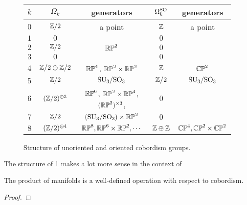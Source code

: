 \begin{figure}[ht]
	\renewcommand{\arraystretch}{1.2}
	\centering
	\begin{tabular}{r||c|c||c|c}
		$k$ & $\Omega_k$          & generators                                          & $\Omega_k^{\mathrm{SO}}$ & generators                 \\
		\hline
		$0$ & $\mathbb{Z}/2$              & a point                                             & $\mathbb{Z}$           & a point                    \\
		$1$ & $0$                 &                                                     & $0$            &                            \\
		$2$ & $\mathbb{Z}/2$              & $\mathbb{RP}^2$                                             & $0$            &                            \\
		$3$ & $0$                 &                                                     & $0$            &                            \\
		$4$ & $\mathbb{Z}/2\oplus \mathbb{Z}/2$   & $\mathbb{RP}^4$, $\mathbb{RP}^2\times \mathbb{RP}^2$                        & $\mathbb{Z}$           & $\mathbb{CP}^2$                    \\
		$5$ & $\mathbb{Z}/2$              & $\mathrm{SU}_3/\mathrm{SO}_3$                                       & $\mathbb{Z}/2$         & $\mathrm{SU}_3/\mathrm{SO}_3$              \\
		$6$ & $(\mathbb{Z}/2)^{\oplus 3}$ & $\mathbb{RP}^6$, $\mathbb{RP}^2\times \mathbb{RP}^4$, $(\mathbb{RP}^2)^{\times 3}$, & $0$            &                            \\
		$7$ & $\mathbb{Z}/2$              & $(\mathrm{SU}_3/\mathrm{SO}_3) \times \mathbb{RP}^2$                        & $0$            &                            \\
		$8$ & $(\mathbb{Z}/2)^{\oplus 4}$ & $\mathbb{RP}^8, \mathbb{RP}^6\times \mathbb{RP}^2, \cdots$                  & $\mathbb{Z}\oplus \mathbb{Z}$  & $\mathbb{CP}^4, \mathbb{CP}^2\times \mathbb{CP}^2$ \\
	\end{tabular}
	\medskip
	\caption{Structure of unoriented and oriented cobordism groups.}\label{fig:cobordism-structure-table}
\end{figure}

The structure of \cref{fig:cobordism-structure-table} makes a lot more sense in the context of

\begin{proposition}
	The product of manifolds is a well-defined operation with respect to cobordism.
\end{proposition}
\begin{proof}
\end{proof}

